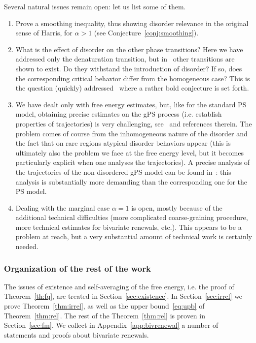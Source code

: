 \documentclass[10pt]{amsart}
\theoremstyle{definition}\newtheorem{defi}[theo]{Definition}\newtheorem{rema}[theo]{Remark}\newtheorem{exam}[theo]{Example}\newtheorem{exem}[theo]{Example}\newtheorem{nota}[theo]{Notation}
\newcommand{\ga}{\alpha}
\begin{document}
Several natural issues remain open: let us list some of them.
\begin{enumerate}
\item Prove a smoothing inequality, thus showing disorder relevance in the original sense of Harris, for $\ga>1$ (see Conjecture~\ref{conj:smoothing}).
\item What is the effect of disorder on the other phase transitions? Here we have addressed only the denaturation transition, but in~\cite{cf:GK} other transitions are shown to exist. Do they withstand the introduction of disorder? If so, does the corresponding critical behavior differ from the homogeneous case? This is the question (quickly) addressed~\cite{cf:NG06} where a rather bold conjecture is set forth.
\item We have dealt only with free energy estimates, but, like for the standard PS model, obtaining precise estimates on the gPS process (i.e. establish properties of trajectories) is very challenging, see~\cite[Chapter~8]{cf:G} and references therein. The problem comes of course from the inhomogeneous nature of the disorder and the fact that on rare regions atypical disorder behaviors appear (this is ultimately also the problem we face at the free energy level, but it becomes particularly explicit when one analyses the trajectories). A precise analysis of the trajectories of the non disordered gPS model can be found in~\cite{cf:BGK}: this analysis is substantially more demanding than the corresponding one for the PS model.
\item Dealing with the marginal case $\ga=1$ is open, mostly because of the additional technical difficulties (more complicated coarse-graining procedure, more technical estimates for bivariate renewals, etc.). This appears to be a problem at reach, but a very substantial amount of technical work is certainly needed.
\end{enumerate}

\subsubsection{Organization of the rest of the work}

The issues of existence and self-averaging of the free energy, i.e. the proof of Theorem~\ref{th:fq}, are treated in Section~\ref{sec:existence}. In Section~\ref{sec:irrel} we prove Theorem~\ref{thm:irrel}, as well as the upper bound~\eqref{eq:upb} of Theorem~\ref{thm:rel}. The rest of the Theorem~\ref{thm:rel} is proven in Section~\ref{sec:fm}. We collect in Appendix~\ref{app:bivrenewal} a number of statements and proofs about bivariate renewals.
\end{document}
